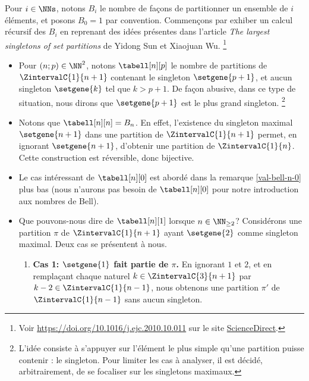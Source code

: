 Pour $i \in \NNs$, notons $B_i$ le nombre de façons de partitionner un ensemble de $i$ éléments, et posons $B_0 = 1$ par convention.
Commençons par exhiber un calcul récursif des $B_i$ en reprenant des idées présentes dans l'article
\emph{\og The largest singletons of set partitions \fg}
de Yidong Sun et Xiaojuan Wu.%
    \footnote{
        Voir
    \url{https://doi.org/10.1016/j.ejc.2010.10.011}
    sur le site \href{https://www.sciencedirect.com/}{ScienceDirect}.
}
%
\begin{itemize}
    \item Pour $(n ; p) \in \NN^2$, notons $\tabell[n][p]$ le nombre de partitions de $\ZintervalC{1}{n+1}$ contenant le singleton $\setgene{p+1}$, et aucun singleton $\setgene{k}$ tel que $k > p+1$.
    De façon abusive, dans ce type de situation, nous dirons que $\setgene{p+1}$ est le plus grand singleton.%
    \footnote{
        L’idée consiste à s’appuyer sur l’élément le plus simple qu’une partition puisse contenir : le singleton.
        Pour limiter les cas à analyser, il est décidé, arbitrairement, de se focaliser sur les singletons maximaux.
    }


    \item Notons que $\tabell[n][n] = B_n$.
    En effet,
    l'existence du singleton maximal $\setgene{n+1}$ dans une partition de $\ZintervalC{1}{n+1}$ permet, en ignorant $\setgene{n+1}$, d'obtenir une partition de $\ZintervalC{1}{n}$.
    Cette construction est réversible, donc bijective.


    \item Le cas intéressant de $\tabell[n][0]$ est abordé dans la remarque \ref{val-bell-n-0} plus bas (nous n'aurons pas besoin de $\tabell[n][0]$ pour notre introduction aux nombres de Bell).


    \item Que pouvons-nous dire de $\tabell[n][1]$ lorsque $n \in \NN_{\geq2}$?
    Considérons une partition $\pi$ de $\ZintervalC{1}{n+1}$ ayant $\setgene{2}$ comme singleton maximal.
    Deux cas se présentent à nous.
    \begin{enumerate}
        \item \textbf{\boldmath Cas 1: $\setgene{1}$ fait partie de $\pi$.}
        En ignorant $1$ et $2$,
        et
        en remplaçant chaque naturel $k \in \ZintervalC{3}{n+1}$ par $k-2 \in \ZintervalC{1}{n-1}$,
        nous obtenons une partition $\pi'$ de $\ZintervalC{1}{n-1}$ sans aucun singleton.



\end{enumerate}
\end{itemize}
